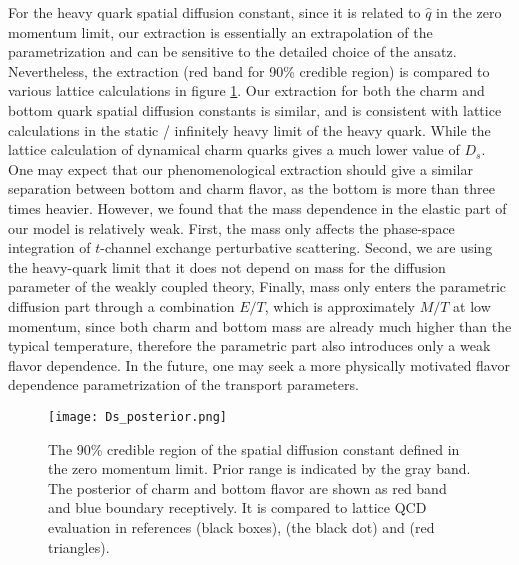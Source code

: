 For the heavy quark spatial diffusion constant, since it is related to $\hat{q}$ in the zero momentum limit, our extraction is essentially an extrapolation of the parametrization and can be sensitive to the detailed choice of the ansatz.
Nevertheless, the extraction (red band for 90\% credible region) is compared to various lattice calculations \cite{Banerjee:2011ra,Ding:2012sp,Francis:2015daa} in  figure \ref{fig:new:posterior-Ds}.
Our extraction for both the charm and bottom quark spatial diffusion constants is similar, and is consistent with lattice calculations in the static / infinitely heavy limit of the heavy quark.
While the lattice calculation of dynamical charm quarks gives a much lower value of $D_s$.
One may expect that our phenomenological extraction should give a similar separation between bottom and charm flavor, as the bottom is more than three times heavier.
However, we found that the mass dependence in the elastic part of our model is relatively weak. 
First, the mass only affects the phase-space integration of $t$-channel exchange perturbative scattering.
Second, we are using the heavy-quark limit that it does not depend on mass for the diffusion parameter of the weakly coupled theory, 
Finally, mass only enters the parametric diffusion part through a combination $E/T$, which is approximately $M/T$ at low momentum, since both charm and bottom mass are already much higher than the typical temperature, therefore the parametric part also introduces only a weak flavor dependence.
In the future, one may seek a more physically motivated flavor dependence parametrization of the transport parameters.

\begin{figure}
\singlespacing
\centering
\texttt{[image: Ds\_posterior.png]}
\caption[The 90\% credible region of the spatial diffusion constant defined]{The 90\% credible region of the spatial diffusion constant defined in the zero momentum limit. Prior range is indicated by the gray band. The posterior of charm and bottom flavor are shown as red band and blue boundary receptively. It is compared to lattice QCD evaluation in references \cite{Banerjee:2011ra} (black boxes), \cite{Francis:2015daa} (the black dot) and \cite{Ding:2012sp} (red triangles).}
\label{fig:new:posterior-Ds}
\end{figure}
